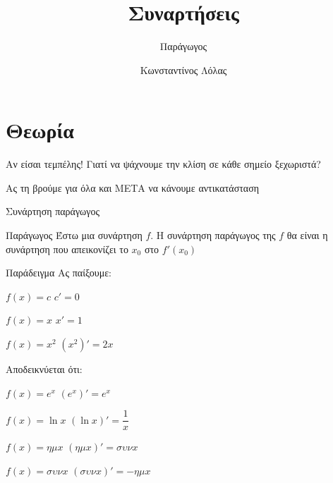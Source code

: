 \documentclass{presentation}
\title{Συναρτήσεις}
\subtitle{Παράγωγος}
\author[Λόλας]{Κωνσταντίνος Λόλας}
\institute[$10^ο$ ΓΕΛ]{$10^ο$ ΓΕΛ Θεσσαλονίκης}
\date{}
\begin{document}
\begin{frame}
    \titlepage
\end{frame}

\section{Θεωρία}
\begin{frame}{Αν είσαι τεμπέλης!}
    Γιατί να ψάχνουμε την κλίση σε κάθε σημείο ξεχωριστά? \pause

    Ας τη βρούμε για όλα και ΜΕΤΑ να κάνουμε αντικατάσταση
\end{frame}

\begin{frame}{Συνάρτηση παράγωγος}
    \begin{block}{Παράγωγος}
        Έστω μια συνάρτηση $f$. Η συνάρτηση παράγωγος της $f$ θα είναι η συνάρτηση που απεικονίζει το $x_0$ στο $f'(x_0)$
    \end{block}
\end{frame}

\begin{frame}{Παράδειγμα}
    Ας παίξουμε:
    \begin{block}{$f(x)=c$}
        $c'=0$
    \end{block} \pause

    \begin{block}{$f(x)=x$}
        $x'=1$
    \end{block} \pause

    \begin{block}{$f(x)=x^2$}
        $(x^2)'=2x$
    \end{block}
\end{frame}

\begin{frame}{Αποδεικνύεται ότι:}
    \begin{block}{$f(x)=e^x$}
        $(e^x)'=e^x$
    \end{block} \pause

    \begin{block}{$f(x)=\ln x$}
        $(\ln x)'=\dfrac{1}{x}$
    \end{block} \pause

    \begin{block}{$f(x)=ημx$}
        $(ημx)'=συνx$
    \end{block} \pause

    \begin{block}{$f(x)=συνx$}
        $(συνx)'=-ημx$
    \end{block}
\end{frame}
\end{document}
